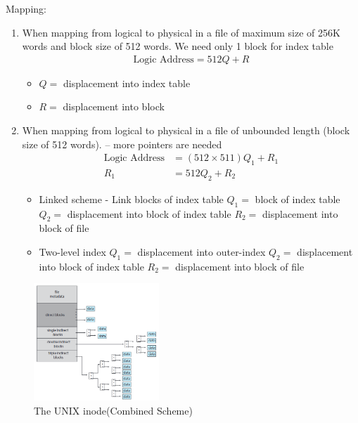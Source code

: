 Mapping: 
\begin{enumerate}
    \item When mapping from logical to physical in a file of maximum
    size of 256K words and block size of 512 words. We need
    only 1 block for index table
    \begin{align*}
        \text{Logic Address}=512Q+R
    \end{align*}
    \begin{itemize}
        \item $Q =$ displacement into index table
        \item $R =$ displacement into block
    \end{itemize}
    \item When mapping from logical to physical in a file of
    unbounded length (block size of 512 words). -- more
    pointers are needed
    \begin{align*}
        \text{Logic Address}&=(512\times 511)Q_1+R_1\\
        R_1&=512Q_2+R_2
    \end{align*}
    \begin{itemize}
        \item Linked scheme - Link blocks of index table
        \subitem $Q_1=$ block of index table
        \subitem $Q_2=$ displacement into block of index table
        \subitem $R_2=$ displacement into block of file
        \item Two-level index
        \subitem $Q_1=$ displacement into outer-index
        \subitem $Q_2=$ displacement into block of index table
        \subitem $R_2=$ displacement into block of file
    \end{itemize}
\end{enumerate}

\begin{figure}[!htb]
    \centering
    \includegraphics[width=0.42\textwidth]{pic/OS11/The UNIX inode}
    \caption{The UNIX inode(Combined Scheme)}
\end{figure}


